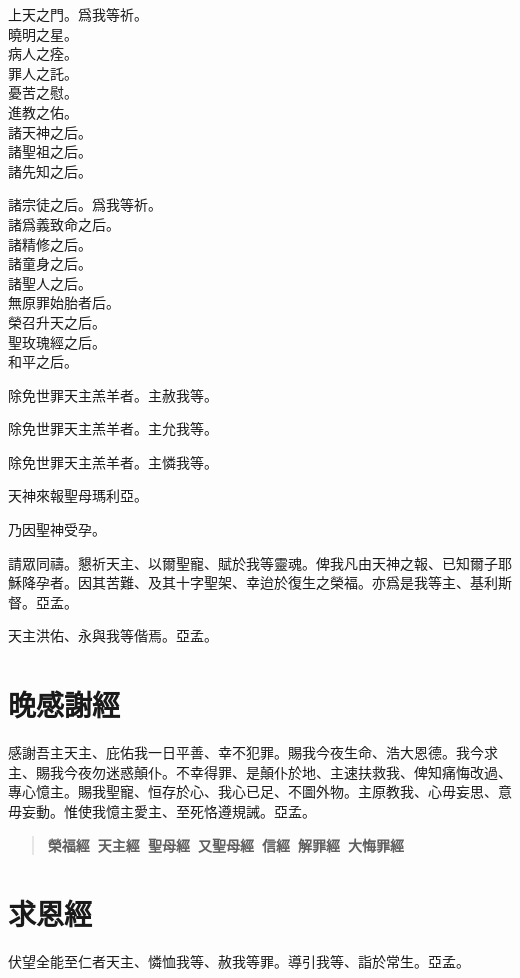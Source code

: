 \versicle 上天之門。\hfill \response 爲我等祈。\\
曉明之星。\\
病人之痊。\\
罪人之託。\\
憂苦之慰。\\
進教之佑。\\
諸天神之后。\\
諸聖祖之后。\\
諸先知之后。

\versicle 諸宗徒之后。\hfill \response 爲我等祈。\\
諸爲義致命之后。\\
諸精修之后。\\
諸童身之后。\\
諸聖人之后。\\
無原罪始胎者后。\\
榮召升天之后。\\
聖玫瑰經之后。\\
和平之后。

\versicle 除免世罪天主羔羊者。\hfill \response 主赦我等。

\versicle 除免世罪天主羔羊者。\hfill \response 主允我等。

\versicle 除免世罪天主羔羊者。\hfill \response 主憐我等。

\versicle 天神來報聖母瑪利亞。

\Response 乃因聖神受孕。

\versicle 請眾同禱。{\cspace}懇祈天主、以爾聖寵、賦於我等靈魂。俾我凡由天神之報、已知爾子耶穌降孕者。因其苦難、及其十字聖架、幸迨於復生之榮福。亦爲是我等主、基利斯督。\response 亞孟。

\versicle 天主洪佑、永與我等偕焉。\response 亞孟。

\section*{晚感謝經}
感謝吾主天主、庇佑我一日平善、幸不犯罪。賜我今夜生命、浩大恩德。我今求主、賜我今夜勿迷惑顛仆。不幸得罪、是顛仆於地、主速扶救我、俾知痛悔改過、專心憶主。賜我聖寵、恒存於心、我心已足、不圖外物。主原教我、心毋妄思、意毋妄動。惟使我憶主愛主、至死恪遵規誡。{\cspace}亞孟。

\begin{quote}
\bfseries 榮福經\ 天主經\ 聖母經\ 又聖母經\ 信經\ 解罪經\ 大悔罪經
\end{quote}

\section*{求恩經}
伏望全能至仁者天主、憐恤我等、赦我等罪。導引我等、詣於常生。{\cspace}亞孟。


